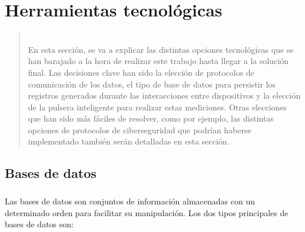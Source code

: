 %
%

\chapter{Herramientas tecnológicas}

\begin{quotation}\noindent\begin{small}\textbf{} \\
En esta sección, se va a explicar las distintas opciones tecnológicas que se han barajado a la hora de realizar este trabajo hasta llegar a la solución final. Las decisiones clave han sido la elección de protocolos de comunicación de los datos, el tipo de base de datos para persistir los registros generados durante las interacciones entre dispositivos y la elección de la pulsera inteligente para realizar estas mediciones. Otras elecciones que han sido más fáciles de resolver, como por ejemplo, las distintas opciones de protocolos de ciberseguridad que podrían haberse implementado también serán detalladas en esta sección.
\end{small}\end{quotation}



\section{Bases de datos}
\paragraph{}
Las bases de datos son conjuntos de información almacenadas con un determinado orden para facilitar su manipulación. Los dos tipos principales de bases de datos son:

